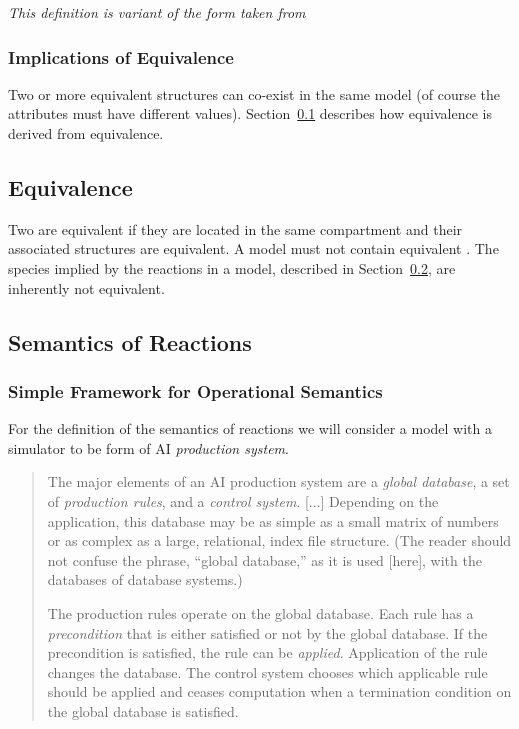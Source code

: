 \documentclass{cekarticle}
\begin{document}
\emph{This definition is variant of the form taken from
\citep{rudolf:1998}}

\subsubsection{Implications of  Equivalence}

Two or more equivalent  structures can co-exist
in the same model (of course the  attributes must have
different values).  Section~\ref{sec:species-equals} describes how
 equivalence is derived from 
equivalence.

\subsection{ Equivalence}
\label{sec:species-equals}

Two  are equivalent if they are located in the same compartment and their associated
 structures are equivalent.  A model must not contain equivalent .
The species implied by the reactions in a model, described in Section~\ref{sec:reaction-semantics},
are inherently not equivalent.

\subsection{Semantics of Reactions}
\label{sec:reaction-semantics}
\subsubsection{Simple Framework for Operational Semantics}

For the definition of the semantics of reactions we will consider a model with a simulator to be form of
AI \emph{production system}.

\begin{quote}
The major elements of an AI production system are a \emph{global database}, a set of
\emph{production rules}, and a \emph{control system}.
[...]
Depending on the application, this database may be as simple as a small matrix of numbers or as
complex as a large, relational, index file structure.  (The reader should not confuse the phrase,
``global database,'' as it is used [here], with the databases of database systems.)

The production rules operate on the global database.  Each rule has a \emph{precondition} that is either
satisfied or not by the global database.  If the precondition is satisfied, the rule can be
\emph{applied}.  Application of the rule changes the database.  The control system chooses which
applicable rule should be applied and ceases computation when a termination condition on the global
database is satisfied.~\citep{Nilsson:1982}
\end{quote}
\end{document}
